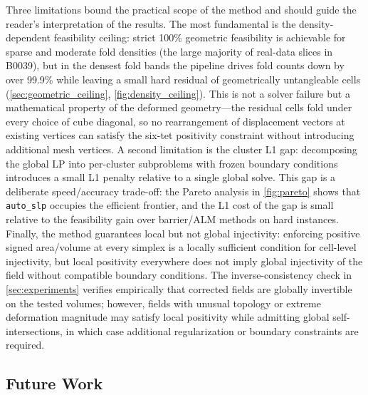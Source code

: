Three limitations bound the practical scope of the method and should guide the reader's interpretation of the results. The most fundamental is the density-dependent feasibility ceiling: strict 100\% geometric feasibility is achievable for sparse and moderate fold densities (the large majority of real-data slices in B0039), but in the densest fold bands the pipeline drives fold counts down by over 99.9\% while leaving a small hard residual of geometrically untangleable cells (\autoref{sec:geometric_ceiling}, \autoref{fig:density_ceiling}). This is not a solver failure but a mathematical property of the deformed geometry---the residual cells fold under every choice of cube diagonal, so no rearrangement of displacement vectors at existing vertices can satisfy the six-tet positivity constraint without introducing additional mesh vertices. A second limitation is the cluster L1 gap: decomposing the global LP into per-cluster subproblems with frozen boundary conditions introduces a small L1 penalty relative to a single global solve. This gap is a deliberate speed/accuracy trade-off: the Pareto analysis in \autoref{fig:pareto} shows that \texttt{auto\_slp} occupies the efficient frontier, and the L1 cost of the gap is small relative to the feasibility gain over barrier/ALM methods on hard instances. Finally, the method guarantees local but not global injectivity: enforcing positive signed area/volume at every simplex is a locally sufficient condition for cell-level injectivity, but local positivity everywhere does not imply global injectivity of the field without compatible boundary conditions. The inverse-consistency check in \autoref{sec:experiments} verifies empirically that corrected fields are globally invertible on the tested volumes; however, fields with unusual topology or extreme deformation magnitude may satisfy local positivity while admitting global self-intersections, in which case additional regularization or boundary constraints are required.

\subsection{Future Work}
\label{sec:future_work}

